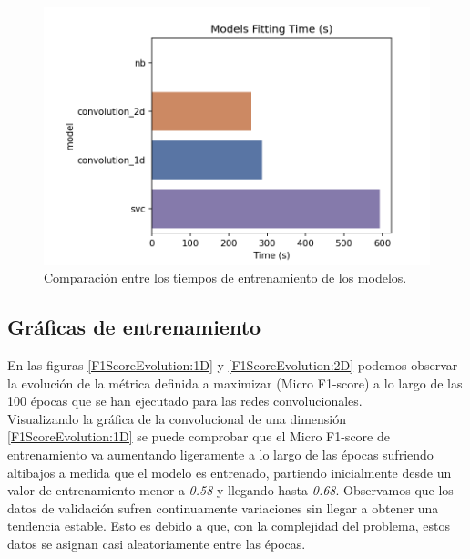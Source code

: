    \begin{figure}[h]
      \centering
      \includegraphics[width=12cm]{archivos/5.Resultados/TiemposEntrenamiento}
      \caption{Comparación entre los tiempos de entrenamiento de los modelos.}
      \label{TiemposEntrenamientoImage}
    \end{figure}


  
  \subsection{Gráficas de entrenamiento}


    En las figuras \eqref{F1ScoreEvolution:1D} y \eqref{F1ScoreEvolution:2D} podemos observar la evolución de la métrica definida a maximizar (Micro F1-score) a lo largo de las 100 épocas que se han ejecutado para las redes convolucionales.\\


    Visualizando la gráfica de la convolucional de una dimensión \eqref{F1ScoreEvolution:1D} se puede comprobar que el Micro F1-score de entrenamiento va aumentando ligeramente a lo largo de las épocas sufriendo altibajos a medida que el modelo es entrenado, partiendo inicialmente desde un valor de entrenamiento menor a \textit{0.58} y llegando hasta \textit{0.68}. Observamos que los datos de validación sufren continuamente variaciones sin llegar a obtener una tendencia estable. Esto es debido a que, con la complejidad del problema, estos datos se asignan casi aleatoriamente entre las épocas.\\


